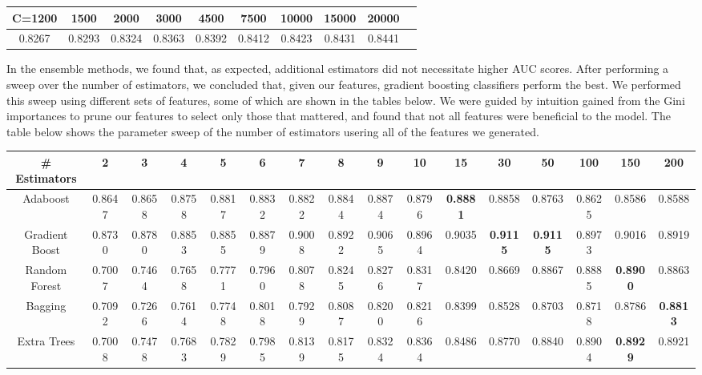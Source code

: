 \documentclass{article} %
\begin{document}
\begin{adjustbox}{width=\textwidth,totalheight=\textheight,keepaspectratio}
\begin{tabular}{cccccccccc}
C=1200 & 1500 & 2000 & 3000 & 4500 & 7500 & 10000 & 15000 & 20000\\
\hline
 0.8267 & 0.8293 & 0.8324 & 0.8363 & 0.8392 & 0.8412 & 0.8423 & 0.8431 & 0.8441
\end{tabular}
\end{adjustbox}

In the ensemble methods, we found that, as expected, additional estimators did
not necessitate higher AUC scores. After performing a sweep over the number of
estimators, we concluded that, given our features, gradient boosting classifiers
perform the best. We performed this sweep using different sets of features, some
of which are shown in the tables below. We were guided by intuition gained from the Gini
importances to prune our features to select only those that mattered, and found
that not all features were beneficial to the model. The table below shows the
parameter sweep of the number of estimators usering
all of the features we generated.

\begin{adjustbox}{width=\textwidth,totalheight=\textheight,keepaspectratio}
\begin{tabular}{c | c c c c c c c c c c c c c c c}
\# Estimators & 2 & 3 & 4 & 5 & 6 & 7 & 8 & 9 & 10 & 15 & 30 & 50 & 100 & 150 & 200\\
\hline
Adaboost & 0.8647 & 0.8658 & 0.8758 & 0.8817 & 0.8832 & 0.8822 & 0.8844 & 0.8874 & 0.8796 & \textbf{0.8881} & 0.8858 & 0.8763 & 0.8625 & 0.8586 & 0.8588\\
Gradient Boost & 0.8730 & 0.8780 & 0.8853 & 0.8855 & 0.8879 & 0.9008 & 0.8922 & 0.9065 & 0.8964 & 0.9035 & \textbf{0.9115} & \textbf{0.9115} & 0.8973 & 0.9016 & 0.8919\\
Random Forest & 0.7007 & 0.7464 & 0.7658 & 0.7771 & 0.7960 & 0.8078 & 0.8245 & 0.8276 & 0.8317 & 0.8420 & 0.8669 & 0.8867 & 0.8885 & \textbf{0.8900} & 0.8863\\
Bagging & 0.7092 & 0.7266 & 0.7614 & 0.7748 & 0.8018 & 0.7929 & 0.8087 & 0.8200 & 0.8216 & 0.8399 & 0.8528 & 0.8703 & 0.8718 & 0.8786 & \textbf{0.8813}\\
Extra Trees & 0.7008 & 0.7478 & 0.7683 & 0.7829 & 0.7985 & 0.8139 & 0.8175 & 0.8324 & 0.8364 & 0.8486 & 0.8770 & 0.8840 & 0.8904 & \textbf{0.8929} & 0.8921
\end{tabular}
\end{adjustbox}
\end{document}
